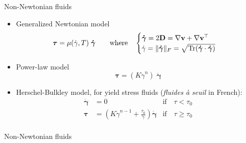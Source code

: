 \documentclass{beamer}  %
\newcommand{\vv}{\mathbf{v}}
\newcommand{\gam}{\boldsymbol{\dot \gamma}}
\begin{document}
\begin{frame}{Non-Newtonian fluids}
    \begin{itemize}
        \item Generalized Newtonian model
        \begin{equation*}
            \boldsymbol{\tau} = \mu(\dot \gamma, T) \;\boldsymbol{\dot \gamma} \qquad \text{where} \quad
            \begin{cases}
                \gam = 2 \mathbf{D} = \nabla \vv + \nabla \vv^\top\\
                \dot \gamma = \|\boldsymbol{\dot \gamma}\|_F = \sqrt{\Tr(\boldsymbol{\dot \gamma} \cdot \boldsymbol{\dot \gamma})}
            \end{cases}
        \end{equation*}
        \pause
        \item Power-law model
        \begin{equation*}
            \boldsymbol\tau = (K \dot \gamma^n) \; \gam
        \end{equation*}
        \pause
        \item Herschel-Bulkley model, for yield stress fluids (\textit{fluides à seuil} in French):
        \begin{align*}
            \gam &= 0 & \text{if} \quad \tau < \tau_0\\
            \boldsymbol\tau &= \left(K \dot \gamma^{n-1} + \frac{\tau_0}{\dot \gamma}\right) \gam & \text{if} \quad \tau \geq \tau_0\\
        \end{align*}
    \end{itemize}    
\end{frame}

\begin{frame}{Non-Newtonian fluids}
    \begin{figure}
        \centering
        
    \end{figure}
\end{frame}

\end{document}
